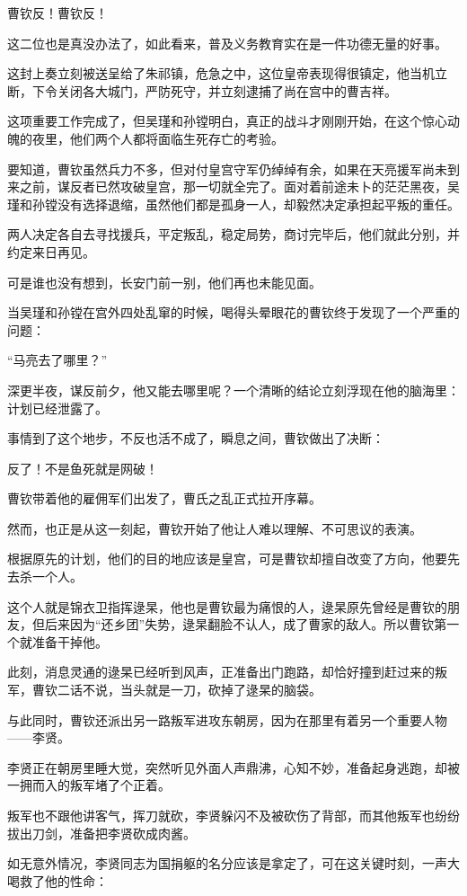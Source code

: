 \begin{multicols}{\theparacolNo}
		曹钦反！曹钦反！

		这二位也是真没办法了，如此看来，普及义务教育实在是一件功德无量的好事。

		这封上奏立刻被送呈给了朱祁镇，危急之中，这位皇帝表现得很镇定，他当机立断，下令关闭各大城门，严防死守，并立刻逮捕了尚在宫中的曹吉祥。

		这项重要工作完成了，但吴瑾和孙镗明白，真正的战斗才刚刚开始，在这个惊心动魄的夜里，他们两个人都将面临生死存亡的考验。

		要知道，曹钦虽然兵力不多，但对付皇宫守军仍绰绰有余，如果在天亮援军尚未到来之前，谋反者已然攻破皇宫，那一切就全完了。面对着前途未卜的茫茫黑夜，吴瑾和孙镗没有选择退缩，虽然他们都是孤身一人，却毅然决定承担起平叛的重任。

		两人决定各自去寻找援兵，平定叛乱，稳定局势，商讨完毕后，他们就此分别，并约定来日再见。

		可是谁也没有想到，长安门前一别，他们再也未能见面。

		当吴瑾和孙镗在宫外四处乱窜的时候，喝得头晕眼花的曹钦终于发现了一个严重的问题：

		“马亮去了哪里？”

		深更半夜，谋反前夕，他又能去哪里呢？一个清晰的结论立刻浮现在他的脑海里：计划已经泄露了。

		事情到了这个地步，不反也活不成了，瞬息之间，曹钦做出了决断：

		反了！不是鱼死就是网破！

		曹钦带着他的雇佣军们出发了，曹氏之乱正式拉开序幕。

		然而，也正是从这一刻起，曹钦开始了他让人难以理解、不可思议的表演。

		根据原先的计划，他们的目的地应该是皇宫，可是曹钦却擅自改变了方向，他要先去杀一个人。

		这个人就是锦衣卫指挥逯杲，他也是曹钦最为痛恨的人，逯杲原先曾经是曹钦的朋友，但后来因为“还乡团”失势，逯杲翻脸不认人，成了曹家的敌人。所以曹钦第一个就准备干掉他。

		此刻，消息灵通的逯杲已经听到风声，正准备出门跑路，却恰好撞到赶过来的叛军，曹钦二话不说，当头就是一刀，砍掉了逯杲的脑袋。

		与此同时，曹钦还派出另一路叛军进攻东朝房，因为在那里有着另一个重要人物——李贤。

		李贤正在朝房里睡大觉，突然听见外面人声鼎沸，心知不妙，准备起身逃跑，却被一拥而入的叛军堵了个正着。

		叛军也不跟他讲客气，挥刀就砍，李贤躲闪不及被砍伤了背部，而其他叛军也纷纷拔出刀剑，准备把李贤砍成肉酱。

		如无意外情况，李贤同志为国捐躯的名分应该是拿定了，可在这关键时刻，一声大喝救了他的性命：


\end{multicols}
